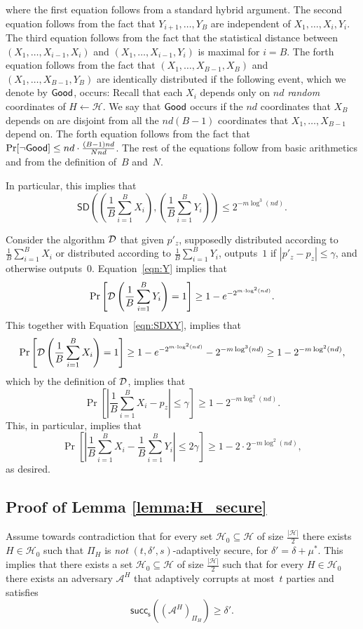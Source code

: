 \documentclass[11pt]{article}
\theoremstyle{plain}
\theoremstyle{definition}
\numberwithin{equation}{section}
\numberwithin{equation}{section} \newcommand{\aka} {also known as\ }
\newcommand{\abs}[1]{\left|#1\right|}
\newcommand{\Hc}{\mathcal H}
\newcommand{\1}{\mathbf{1}}
\newcommand{\Adv}{\mathcal A}
\newcommand{\SD}{\mathsf{SD}}
\newcommand{\successset}{{\mathsf{succ_{s}}}}
\newcommand{\valset}[2]{{\successset(#2_{#1})}}
\theoremstyle{remark}
\begin{document}
where the first equation follows from a standard hybrid argument. The second
equation follows from the fact that $Y_{i+1},\ldots,Y_B$ are independent of
$X_1,\ldots,X_i,Y_i$.  The third equation follows from the fact that the
statistical distance between $(X_1,\ldots,X_{i-1},X_i)$ and
$(X_1,\ldots,X_{i-1},Y_i)$ is maximal for $i=B$.  The forth equation follows
from the fact that $(X_1,\ldots,X_{B-1},X_B)$ and $(X_1,\ldots,X_{B-1},Y_B)$ are
identically distributed if the following event, which we denote by $\mathsf{Good}$,
occurs: Recall that each $X_i$ depends only on $nd$ {\em random} coordinates of
$H\leftarrow\Hc$. We say that $\mathsf{Good}$ occurs if the $nd$ coordinates that $X_B$
depends on are disjoint from all the $nd(B-1)$ coordinates that
$X_1,\ldots,X_{B-1}$ depend on. The forth equation follows from the fact that
$\Pr[\neg{\mathsf{Good}}]\leq nd\cdot\frac{(B-1)nd}{Nnd}$. The rest of the equations
follow from basic arithmetics and from the definition of~$B$ and~$N$.

In particular, this implies that
\begin{equation}\label{eqn:SDXY}
  \SD\left(\left(\frac{1}{B}\sum_{i=1}^B X_i\right), \left(\frac{1}{B}\sum_{i=1}^B Y_i\right)\right)\leq 2^{-m\log^3(nd)}.
\end{equation}

Consider the algorithm ${\cal D}$ that given $p'_z$, supposedly
distributed according to $\frac{1}{B}\sum_{i=1}^B X_i$ or distributed according
to $\frac{1}{B}\sum_{i=1}^B Y_i$, outputs~$1$ if $|p'_z-p_z|\leq \gamma$, and
otherwise outputs~$0$.  Equation~\eqref{eqn:Y} implies that
$$
\Pr\left[{\cal D}\left(\frac{1}{B}\sum_{i=1}^B Y_i\right)=1\right]\geq
1-e^{-2^{m\cdot \log^2(nd)}}.
$$
This together with Equation~\eqref{eqn:SDXY}, implies that
$$
\Pr\left[{\cal D}\left(\frac{1}{B}\sum_{i=1}^B X_i\right)=1\right]\geq
1-e^{-2^{m\cdot \log^2(nd)}}-2^{-m\log^3(nd)}\geq 1-2^{-m\log^2(nd)},
$$
which by the definition of ${\cal D}$, implies that
$$
\Pr\left[\left|\frac{1}{B}\sum_{i=1}^B X_i-p_z\right|\leq \gamma\right]\geq 1-
2^{-m\log^2(nd)}.
$$
This, in particular, implies that
$$
\Pr\left[\left|\frac{1}{B}\sum_{i=1}^B X_i-\frac{1}{B}\sum_{i=1}^B
    Y_i\right|\leq 2\gamma\right]\geq 1-2\cdot 2^{-m\log^2(nd)},
$$
as desired.

\subsection{Proof of Lemma \ref{lemma:H_secure}}\label{sec:proof_of_lemma}
Assume towards contradiction that for every set $\Hc_0\subseteq\Hc$ of size $\frac{\abs{\Hc}}{2}$ there exists $H\in\Hc_0$ such that $\Pi_H$ is
\emph{not} $(t,\delta',s)$-adaptively secure, for $\delta'= \delta+\mu^*$. This implies that there exists a set $\Hc_0\subseteq\Hc$ of size $\frac{\abs{\Hc}}{2}$ such that for every $H\in\Hc_0$ there exists an
adversary $\Adv^H$ that adaptively corrupts at most~$t$ parties and satisfies $$\valset{\Pi_H}{\left(\Adv^H\right)} \geq \delta'.$$
\end{document}

